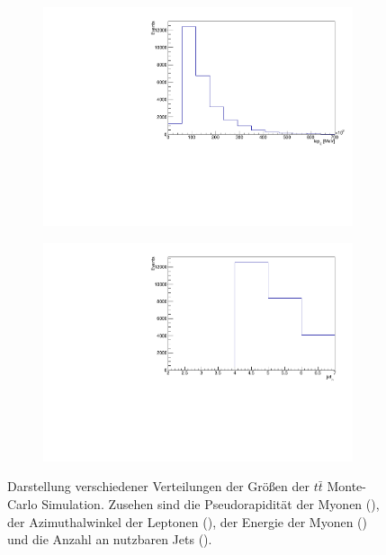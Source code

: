 \begin{figure}[H]
\begin{subfigure}{0.5\textwidth}
    \includegraphics[width=\linewidth]{plots_and_txt/ttbar.mu_selected_/ttbar.mu_selected_lep_E.pdf}
    \caption{}
    \label{fig:jet_pt_good2}
  \end{subfigure}%
  \begin{subfigure}{0.5\textwidth}
    \centering
    \includegraphics[width=\linewidth]{plots_and_txt/ttbar.mu_selected_/ttbar.mu_selected_jet_n.pdf}
    \caption{}
    \label{fig:met_et2}
  \end{subfigure}%
  \caption{Darstellung verschiedener Verteilungen der Größen der $t\bar{t}$ Monte-Carlo Simulation.
  Zusehen sind die Pseudorapidität der Myonen (), der Azimuthalwinkel der Leptonen (), der Energie der Myonen () und die Anzahl an nutzbaren Jets ().
  }
  \label{fig:Distributions2}
\end{figure}

